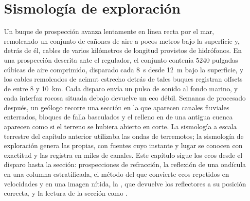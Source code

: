 \chapter{Sismología de exploración}\label{ch:b3:exploration-seismology}

Un buque de prospección avanza lentamente en línea recta por el mar, remolcando un conjunto de cañones de aire
a pocos metros bajo la superficie y, detrás de él, cables de varios
kilómetros de longitud provistos de hidrófonos. En una prospección descrita ante el
regulador, el conjunto contenía \num{5240} pulgadas cúbicas de aire comprimido, disparado cada
\qty{8}{s} desde \qty{12}{m} bajo la superficie, y los cables remolcados de acimut estrecho
detrás de tales buques registran offsets de entre 8 y \qty{10}{km}.
Cada disparo envía un pulso de sonido al fondo marino, y cada interfaz rocosa
situada debajo devuelve un eco débil. Semanas de procesado después, un geólogo recorre
una sección en la que aparecen canales fluviales enterrados, bloques de falla basculados y
el relleno en  de una antigua cuenca aparecen como si el terreno se hubiera abierto en corte.
La sismología a escala terrestre del capítulo anterior utilizaba las ondas de
terremotos; la sismología de exploración genera las propias, con fuentes cuyo instante y
lugar se conocen con exactitud y las registra en miles de canales. Este
capítulo sigue los ecos desde el disparo hasta la sección: prospecciones de refracción,
la reflexión de una ondícula en una columna estratificada, el método del 
que convierte ecos repetidos en velocidades y en una imagen nítida, la , que
devuelve los reflectores a su posición correcta, y la lectura de la sección como
.

